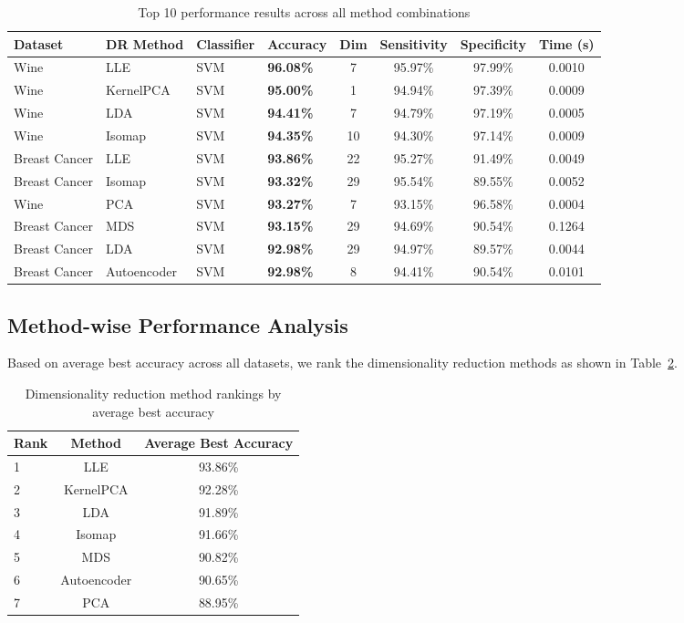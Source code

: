 \documentclass[review]{elsarticle}
\begin{document}
\begin{table}[H]
\centering
\caption{Top 10 performance results across all method combinations}
\label{tab:top_results}
\scriptsize
\begin{tabular}{@{}llllcccc@{}}
\toprule
\textbf{Dataset} & \textbf{DR Method} & \textbf{Classifier} & \textbf{Accuracy} & \textbf{Dim} & \textbf{Sensitivity} & \textbf{Specificity} & \textbf{Time (s)} \\
\midrule
Wine & LLE & SVM & \textbf{96.08\%} & 7 & 95.97\% & 97.99\% & 0.0010 \\
Wine & KernelPCA & SVM & \textbf{95.00\%} & 1 & 94.94\% & 97.39\% & 0.0009 \\
Wine & LDA & SVM & \textbf{94.41\%} & 7 & 94.79\% & 97.19\% & 0.0005 \\
Wine & Isomap & SVM & \textbf{94.35\%} & 10 & 94.30\% & 97.14\% & 0.0009 \\
Breast Cancer & LLE & SVM & \textbf{93.86\%} & 22 & 95.27\% & 91.49\% & 0.0049 \\
Breast Cancer & Isomap & SVM & \textbf{93.32\%} & 29 & 95.54\% & 89.55\% & 0.0052 \\
Wine & PCA & SVM & \textbf{93.27\%} & 7 & 93.15\% & 96.58\% & 0.0004 \\
Breast Cancer & MDS & SVM & \textbf{93.15\%} & 29 & 94.69\% & 90.54\% & 0.1264 \\
Breast Cancer & LDA & SVM & \textbf{92.98\%} & 29 & 94.97\% & 89.57\% & 0.0044 \\
Breast Cancer & Autoencoder & SVM & \textbf{92.98\%} & 8 & 94.41\% & 90.54\% & 0.0101 \\
\bottomrule
\end{tabular}
\end{table}

\subsection{Method-wise Performance Analysis}

Based on average best accuracy across all datasets, we rank the dimensionality reduction methods as shown in Table~\ref{tab:dr_rankings}.

\begin{table}[h]
\centering
\caption{Dimensionality reduction method rankings by average best accuracy}
\label{tab:dr_rankings}
\begin{tabular}{@{}lcc@{}}
\toprule
\textbf{Rank} & \textbf{Method} & \textbf{Average Best Accuracy} \\
\midrule
1 & LLE & 93.86\% \\
2 & KernelPCA & 92.28\% \\
3 & LDA & 91.89\% \\
4 & Isomap & 91.66\% \\
5 & MDS & 90.82\% \\
6 & Autoencoder & 90.65\% \\
7 & PCA & 88.95\% \\
\bottomrule
\end{tabular}
\end{table}
\end{document}
